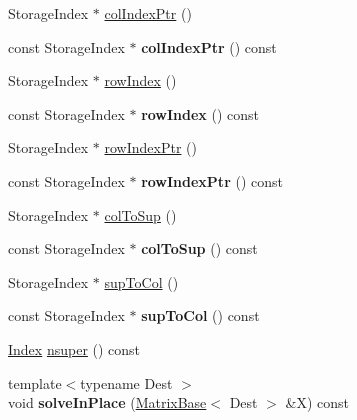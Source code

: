 \begin{DoxyCompactItemize}
Storage\+Index $\ast$ \hyperlink{group___sparse_l_u___module_a87c0272aedd8ee01d4245bd719738b5d}{col\+Index\+Ptr} ()
\item 
\mbox{\label{group___sparse_l_u___module_a764f612ebc0bf7ec9118b2cabc280861}} 
const Storage\+Index $\ast$ {\bfseries col\+Index\+Ptr} () const
\item 
Storage\+Index $\ast$ \hyperlink{group___sparse_l_u___module_a8e6b4f399aa468a10e58db627d43a12a}{row\+Index} ()
\item 
\mbox{\label{group___sparse_l_u___module_a3194b3b2c7874afdbd0d1a19c53fd140}} 
const Storage\+Index $\ast$ {\bfseries row\+Index} () const
\item 
Storage\+Index $\ast$ \hyperlink{group___sparse_l_u___module_a826186a823bf49f81b20673cce741250}{row\+Index\+Ptr} ()
\item 
\mbox{\label{group___sparse_l_u___module_a45c1a5bec04eaf3da78ad2f207c30a74}} 
const Storage\+Index $\ast$ {\bfseries row\+Index\+Ptr} () const
\item 
Storage\+Index $\ast$ \hyperlink{group___sparse_l_u___module_a1e2c012b63809715188aa7f0c722868d}{col\+To\+Sup} ()
\item 
\mbox{\label{group___sparse_l_u___module_a1da320fc4656efe1013215ef001b7195}} 
const Storage\+Index $\ast$ {\bfseries col\+To\+Sup} () const
\item 
Storage\+Index $\ast$ \hyperlink{group___sparse_l_u___module_ab2b1bdd663288f1f2af09ec42a0a62a5}{sup\+To\+Col} ()
\item 
\mbox{\label{group___sparse_l_u___module_a0a613183f2c014fda26c7a539d555576}} 
const Storage\+Index $\ast$ {\bfseries sup\+To\+Col} () const
\item 
\hyperlink{namespace_eigen_a62e77e0933482dafde8fe197d9a2cfde}{Index} \hyperlink{group___sparse_l_u___module_a9c0b29102914a6ef9cfd6280fa016fa8}{nsuper} () const
\item 
\mbox{\label{group___sparse_l_u___module_a8c0741b8247c1ac7dd37b885cfd28247}} 
{\footnotesize template$<$typename Dest $>$ }\\void {\bfseries solve\+In\+Place} (\hyperlink{group___core___module_class_eigen_1_1_matrix_base}{Matrix\+Base}$<$ Dest $>$ \&X) const
\end{DoxyCompactItemize}
